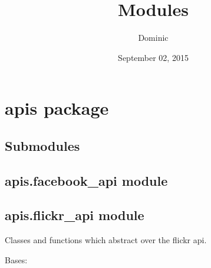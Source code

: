 \documentclass[letterpaper,10pt,english]{sphinxmanual}
\title{Modules}
\date{September 02, 2015}
\author{Dominic}
\begin{document}
\maketitle
\tableofcontents
{}\label{modules::doc}



\chapter{apis package}
\label{apis:apis-package}\label{apis::doc}\label{apis:modules}

\section{Submodules}
\label{apis:submodules}

\section{apis.facebook\_api module}
\label{apis:apis-facebook-api-module}\label{apis:module-apis.facebook_api}

\section{apis.flickr\_api module}
\label{apis:module-apis.flickr_api}\label{apis:apis-flickr-api-module}
Classes and functions which abstract over the flickr api.

\begin{fulllineitems}
\label{apis:apis.flickr_api.FlickrQuery}
Bases: {\hyperref[apis:apis.Query]{\emph{}}}

\end{fulllineitems}

\end{document}

